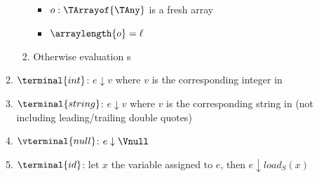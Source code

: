 \begin{enumerate}
\begin{enumerate}
\begin{enumerate}
      \begin{itemize}
      \item $o : \TArrayof{\TAny}$ is a fresh array
      \item $\arraylength{o} = \ell$
      \end{itemize}
    \item Otherwise evaluation \fail{}s
    \end{enumerate}
  \item $\terminal{int}$:  $e \downarrow v$ where $v$ is the corresponding integer in \TInt
  \item $\terminal{string}$: $e \downarrow v$ where $v$ is the corresponding string in \TString{} (not including leading/trailing double quotes)
  \item $\vterminal{null}$: $e \downarrow \Vnull$
  \item $\terminal{id}$: let $x$ the variable assigned to $e$, then $e \downarrow \textit{load}_S(x)$
  \end{enumerate}
\end{enumerate}

